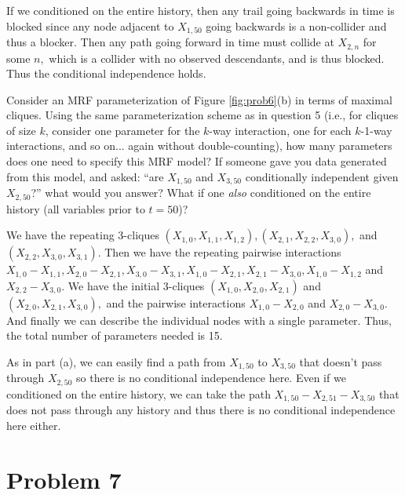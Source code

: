 \documentclass[letterpaper]{article}
\begin{document}
\begin{enumerate}[a)]
\begin{soln}
    If we conditioned on the entire history, then any trail going backwards in time is blocked since any node adjacent to $X_{1, 50}$ going backwards is a non-collider and thus a blocker. Then any path going forward in time must collide at $X_{2, n}$ for some $n,$ which is a collider with no observed descendants, and is thus blocked. Thus the conditional independence holds. 
  \end{soln}

  \ii Consider an MRF parameterization of Figure \ref{fig:prob6}(b) in terms of maximal cliques. Using the same parameterization scheme as in question 5 (i.e., for cliques of size $k$, consider one parameter for the $k$-way interaction, one for each $k$-1-way interactions, and so on... again without double-counting), how many parameters does one need to specify this MRF model? If someone gave you data generated from this model, and asked: ``are $X_{1,50}$ and $X_{3,50}$ conditionally independent given $X_{2,50}$?'' what would you answer? What if one \emph{also} conditioned on the entire history (all variables prior to $t=50$)?
  \begin{soln}
    We have the repeating 3-cliques $\left( X_{1, 0}, X_{1, 1}, X_{1, 2} \right), \left( X_{2, 1}, X_{2, 2}, X_{3, 0} \right),$ and $\left( X_{2, 2}, X_{3, 0}, X_{3, 1} \right).$ Then we have the repeating pairwise interactions $X_{1, 0}-X_{1, 1}, X_{2, 0}-X_{2, 1}, X_{3, 0}-X_{3, 1}, X_{1, 0}-X_{2, 1}, X_{2, 1}-X_{3, 0}, X_{1, 0}-X_{1, 2}$ and $X_{2, 2}-X_{3, 0}.$ We have the initial 3-cliques $\left( X_{1, 0}, X_{2, 0}, X_{2, 1} \right)$ and $\left( X_{2, 0}, X_{2, 1}, X_{3, 0} \right),$ and the pairwise interactions $X_{1, 0}-X_{2, 0}$ and $X_{2, 0}-X_{3, 0}.$ And finally we can describe the individual nodes with a single parameter. Thus, the total number of parameters needed is 15. 

    As in part (a), we can easily find a path from $X_{1, 50}$ to $X_{3, 50}$ that doesn't pass through $X_{2, 50}$ so there is no conditional independence here. Even if we conditioned on the entire history, we can take the path $X_{1, 50}-X_{2, 51}-X_{3, 50}$ that does not pass through any history and thus there is no conditional independence here either.
  \end{soln}

\end{enumerate}




\section*{Problem 7}
\end{document}
